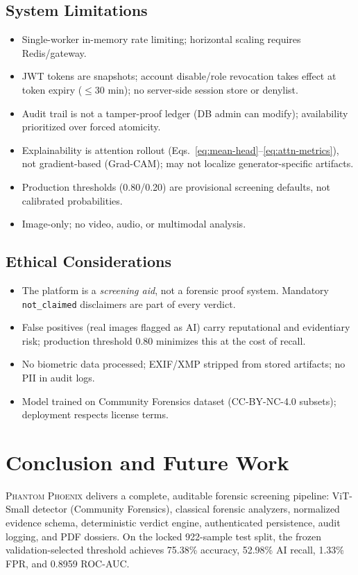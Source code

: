 \documentclass[10pt,conference,compsoc]{IEEEtran}
\begin{document}
\subsection{System Limitations}
\begin{itemize}
  \item Single-worker in-memory rate limiting; horizontal scaling requires Redis/gateway.
  \item JWT tokens are snapshots; account disable/role revocation takes effect at token expiry ($\le$30 min); no server-side session store or denylist.
  \item Audit trail is not a tamper-proof ledger (DB admin can modify); availability prioritized over forced atomicity.
  \item Explainability is attention rollout (Eqs.~\ref{eq:mean-head}--\ref{eq:attn-metrics}), not gradient-based (Grad-CAM); may not localize generator-specific artifacts.
  \item Production thresholds (0.80/0.20) are provisional screening defaults, not calibrated probabilities.
  \item Image-only; no video, audio, or multimodal analysis.
\end{itemize}

\subsection{Ethical Considerations}
\begin{itemize}
  \item The platform is a \emph{screening aid}, not a forensic proof system. Mandatory \texttt{not\_claimed} disclaimers are part of every verdict.
  \item False positives (real images flagged as AI) carry reputational and evidentiary risk; production threshold 0.80 minimizes this at the cost of recall.
  \item No biometric data processed; EXIF/XMP stripped from stored artifacts; no PII in audit logs.
  \item Model trained on Community Forensics dataset (CC-BY-NC-4.0 subsets); deployment respects license terms.
\end{itemize}

\section{Conclusion and Future Work}
\label{sec:conclusion}

\textsc{Phantom Phoenix} delivers a complete, auditable forensic screening pipeline: ViT-Small detector (Community Forensics), classical forensic analyzers, normalized evidence schema, deterministic verdict engine, authenticated persistence, audit logging, and PDF dossiers.
On the locked 922-sample test split, the frozen validation-selected threshold achieves 75.38\% accuracy, 52.98\% AI recall, 1.33\% FPR, and 0.8959 ROC-AUC.
\end{document}
